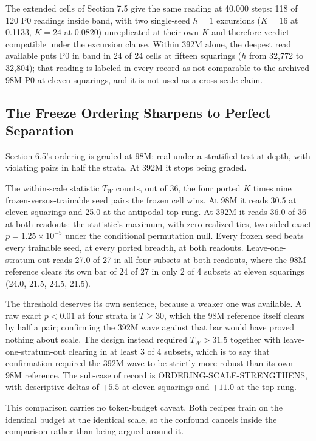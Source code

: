 The extended cells of Section 7.5 give the same reading at 40,000
steps: 118 of 120 P0 readings inside band, with two single-seed $h{=}1$
excursions ($K{=}16$ at 0.1133, $K{=}24$ at 0.0820) unreplicated at
their own $K$ and therefore verdict-compatible under the excursion
clause. Within 392M alone, the deepest read available puts P0 in band
in 24 of 24 cells at fifteen squarings ($h$ from 32,772 to 32,804); that
reading is labeled in every record as not comparable to the archived 98M
P0 at eleven squarings, and it is not used as a cross-scale claim.

\subsection{The Freeze Ordering Sharpens to Perfect Separation}

Section 6.5's ordering is graded at 98M: real under a stratified test at
depth, with violating pairs in half the strata. At 392M it stops being
graded.

The within-scale statistic $T_W$ counts, out of 36, the four ported $K$
times nine frozen-versus-trainable seed pairs the frozen cell wins. At
98M it reads 30.5 at eleven squarings and 25.0 at the antipodal top
rung. At 392M it reads 36.0 of 36 at both readouts: the statistic's
maximum, with zero realized ties, two-sided exact
$p = 1.25 \times 10^{-5}$ under the conditional permutation null. Every
frozen seed beats every trainable seed, at every ported breadth, at both
readouts. Leave-one-stratum-out reads 27.0 of 27 in all four subsets at
both readouts, where the 98M reference clears its own bar of 24 of 27 in
only 2 of 4 subsets at eleven squarings (24.0, 21.5, 24.5, 21.5).

The threshold deserves its own sentence, because a weaker one was
available. A raw exact $p < 0.01$ at four strata is $T \geq 30$, which
the 98M reference itself clears by half a pair; confirming the 392M wave
against that bar would have proved nothing about scale. The design
instead required $T_W > 31.5$ together with leave-one-stratum-out
clearing in at least 3 of 4 subsets, which is to say that confirmation
required the 392M wave to be strictly more robust than its own 98M
reference. The sub-case of record is ORDERING-SCALE-STRENGTHENS, with
descriptive deltas of $+5.5$ at eleven squarings and $+11.0$ at the top
rung.

This comparison carries no token-budget caveat. Both recipes train on
the identical budget at the identical scale, so the confound cancels
inside the comparison rather than being argued around it.

